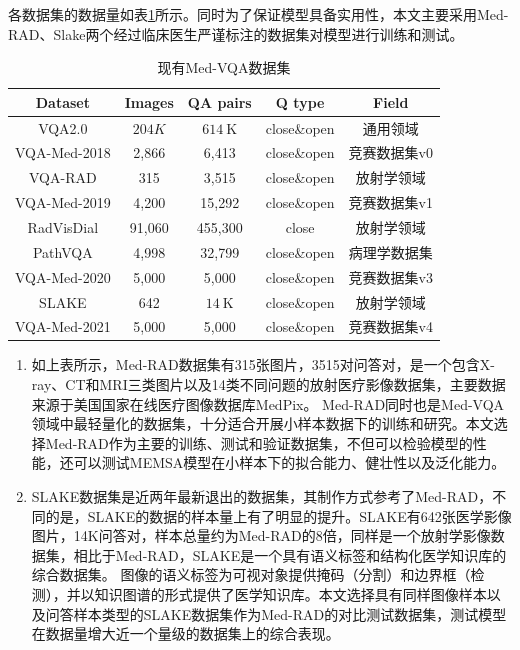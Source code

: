 各数据集的数据量如表\ref{tab:Date-set}所示。同时为了保证模型具备实用性，本文主要采用Med-RAD、Slake两个经过临床医生严谨标注的数据集对模型进行训练和测试。
\begin{table}
	\caption{\label{tab:Date-set}现有Med-VQA数据集}
	\centering
	\small
	\begin{tabular}{|c|c|c|c|c|}
		\hline Dataset & Images & QA pairs & Q type & Field \\
		\hline VQA2.0 & $204 K$ & $614 \mathrm{~K}$ & close\&open & 通用领域 \\
		\hline VQA-Med-2018 & 2,866 & 6,413 & close\&open & 竞赛数据集v0 \\
		\hline VQA-RAD & 315 & 3,515 & close\&open & 放射学领域 \\
		\hline VQA-Med-2019 & 4,200 & 15,292 & close\&open  & 竞赛数据集v1 \\
		\hline RadVisDial & 91,060 & 455,300 & close & 放射学领域 \\
		\hline PathVQA & 4,998 & 32,799 & close\&open & 病理学数据集 \\
		\hline VQA-Med-2020 & 5,000 & 5,000 & close\&open  & 竞赛数据集v3 \\
		\hline SLAKE & 642 & $14 \mathrm{~K}$ & close\&open & 放射学领域 \\
		\hline VQA-Med-2021 & 5,000 & 5,000 & close\&open & 竞赛数据集v4 \\
		\hline
	\end{tabular}
\end{table}
%
\begin{enumerate}[topsep = 0 pt, itemsep= 0 pt, parsep=0pt, partopsep=0pt, leftmargin=44pt, itemindent=0pt, labelsep=6pt, label=(\arabic*)]
	\item 如上表所示，Med-RAD数据集有315张图片，3515对问答对，是一个包含X-ray、CT和MRI三类图片以及14类不同问题的放射医疗影像数据集，主要数据来源于美国国家在线医疗图像数据库MedPix。
	Med-RAD同时也是Med-VQA领域中最轻量化的数据集，十分适合开展小样本数据下的训练和研究。本文选择Med-RAD作为主要的训练、测试和验证数据集，不但可以检验模型的性能，还可以测试MEMSA模型在小样本下的拟合能力、健壮性以及泛化能力。
	\item SLAKE数据集是近两年最新退出的数据集，其制作方式参考了Med-RAD，不同的是，SLAKE的数据的样本量上有了明显的提升。SLAKE有642张医学影像图片，14K问答对，样本总量约为Med-RAD的8倍，同样是一个放射学影像数据集，相比于Med-RAD，SLAKE是一个具有语义标签和结构化医学知识库的综合数据集。
	图像的语义标签为可视对象提供掩码（分割）和边界框（检测），并以知识图谱的形式提供了医学知识库。本文选择具有同样图像样本以及问答样本类型的SLAKE数据集作为Med-RAD的对比测试数据集，测试模型在数据量增大近一个量级的数据集上的综合表现。
\end{enumerate}

